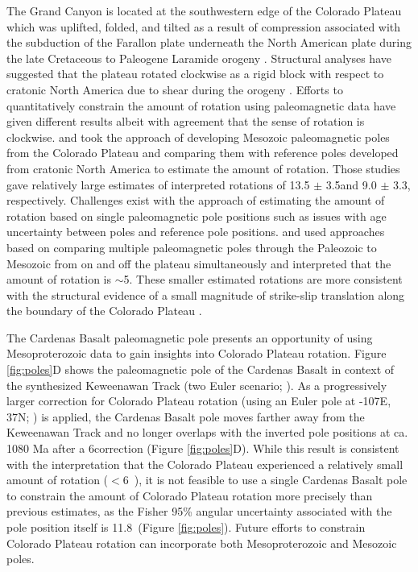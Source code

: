 The Grand Canyon is located at the southwestern edge of the Colorado Plateau which was uplifted, folded, and tilted as a result of compression associated with the subduction of the Farallon plate underneath the North American plate during the late Cretaceous to Paleogene Laramide orogeny \citep{Yonkee2015a, Karlstrom2012a, Timmons2012a, Karlstrom2022a}. Structural analyses have suggested that the plateau rotated clockwise as a rigid block with respect to cratonic North America due to shear during the orogeny \cite[e.g.][]{Hamilton1981a, Hamilton1988a}. Efforts to quantitatively constrain the amount of rotation using paleomagnetic data have given different results albeit with agreement that the sense of rotation is clockwise. \cite{Kent1993a} and \cite{Steiner2003a} took the approach of developing Mesozoic paleomagnetic poles from the Colorado Plateau and comparing them with reference poles developed from cratonic North America to estimate the amount of rotation. Those studies gave relatively large estimates of interpreted rotations of 13.5 $\pm$ 3.5\textdegree and 9.0 $\pm$ 3.3\textdegree, respectively. Challenges exist with the approach of estimating the amount of rotation based on single paleomagnetic pole positions such as issues with age uncertainty between poles and reference pole positions. \cite{Garza1998a} and \cite{Bryan1990a} used approaches based on comparing multiple paleomagnetic poles through the Paleozoic to Mesozoic from on and off the plateau simultaneously and interpreted that the amount of rotation is $\sim$5\textdegree. These smaller estimated rotations are more consistent with the structural evidence of a small magnitude of strike-slip translation along the boundary of the Colorado Plateau \cite[e.g.][]{Woodward1997a}. 

The Cardenas Basalt paleomagnetic pole presents an opportunity of using Mesoproterozoic data to gain insights into Colorado Plateau rotation. Figure \ref{fig:poles}D shows the paleomagnetic pole of the Cardenas Basalt in context of the synthesized Keweenawan Track (two Euler scenario; \citealp{Swanson-Hysell2019a}). As a progressively larger correction for Colorado Plateau rotation (using an Euler pole at -107\textdegree E, 37\textdegree N; \citealp{Bryan1990a}) is applied, the Cardenas Basalt pole moves farther away from the Keweenawan Track and no longer overlaps with the inverted pole positions at ca. 1080 Ma after a 6\textdegree correction (Figure \ref{fig:poles}D). While this result is consistent with the interpretation that the Colorado Plateau experienced a relatively small amount of rotation ($<$6\textdegree\ ), it is not feasible to use a single Cardenas Basalt pole to constrain the amount of Colorado Plateau rotation more precisely than previous estimates, as the Fisher 95\% angular uncertainty associated with the pole position itself is 11.8\textdegree\ (Figure \ref{fig:poles}). Future efforts to constrain Colorado Plateau rotation can incorporate both Mesoproterozoic and Mesozoic poles.


